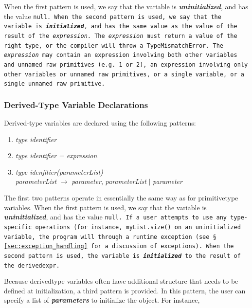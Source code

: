 \documentclass{article}
\begin{document}
When the first pattern is used, we say that the variable is
\textbf{\emph{uninitialized}}, and has the value \tt null\rm. When the second
pattern is used, we say that the variable is \textbf{\emph{initialized}}, and has
the same value as the value of the result of the \emph{expression}. The
\emph{expression} must return a value of the right type, or the compiler will
throw a \tt TypeMismatchError\rm. The \emph{expression} may contain an expression
involving both other variables and unnamed raw primitives (e.g. 1 or 2), an
expression involving only other variables or unnamed raw primitives, or a single
variable, or a single unnamed raw primitive.


\subsubsection{Derived-Type Variable Declarations} %
\label{ssub:derived_type_variable_declarations}

Derived-type variables are declared using the following patterns:

\begin{enumerate}
  \item \emph{type identifier}
  \item \emph{type identifier = expression }
  \item \emph{type idenfitier(parameterList)} \\
  \indent \emph{parameterList} $\rightarrow$ \emph{parameter}, \emph{parameterList} $|$ \emph{parameter}
\end{enumerate}

The first two patterns operate in essentially the same way as for primitive­type
variables. When the first pattern is used, we say that the variable is
\textbf{\emph{uninitialized}}, and has the value \tt null\rm. If a user attempts
to use any type­specific operations (for instance, \tt myList.size() \rm on an
uninitialized variable, the program will through a run­time exception (see \S
\ref{sec:exception_handling} for a discussion of exceptions). When the second
pattern is used, the variable is \textbf{\emph{initialized}} to the result of the
\tt derived­expr\rm.

Because derived­type variables often have additional structure that needs to be
defined at initialization, a third pattern is provided. In this pattern, the user
can specify a list of \textbf{\emph{parameters}} to initialize the object. For
instance,
\end{document}
